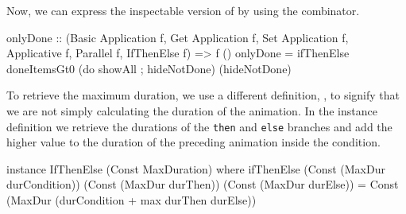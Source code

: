 Now, we can express the inspectable version of  by using the  combinator.

\begin{code}
onlyDone :: (Basic Application f, Get Application f,
  Set Application f, Applicative f, Parallel f, IfThenElse f)
  => f ()
onlyDone = ifThenElse doneItemsGt0
  (do showAll ; hideNotDone)
  (hideNotDone)
\end{code}

To retrieve the maximum duration, we use a different  definition, , to signify that we are not simply calculating the duration of the animation. In the instance definition we retrieve the durations of the \texttt{then} and \texttt{else} branches and add the higher value to the duration of the preceding animation inside the condition.

\begin{code}
 instance IfThenElse (Const MaxDuration) where
   ifThenElse (Const (MaxDur durCondition))
              (Const (MaxDur durThen))
              (Const (MaxDur durElse)) =
   Const (MaxDur (durCondition + max durThen durElse))
\end{code}
